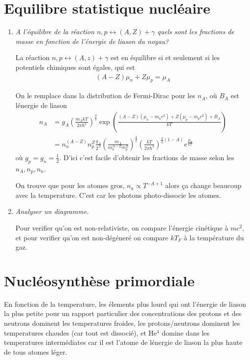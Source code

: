 \documentclass[10pt]{report}
\begin{document}
\section{Equilibre statistique nucl\'eaire}

\begin{enumerate}[1.]
    \item \emph{A l'\'equilibre de la r\'eaction $n,p \leftrightarrow (A,Z) + \gamma$ quels sont les fractions de masse en fonction de l'\'energie de liason du noyau?}

        La r\'eaction $n,p \leftrightarrow (A,z) + \gamma$ est en \'equilibre si et seulement si les potentiels chimiques sont \'egales, qui est
        \begin{align}
            (A-Z)\mu_n + Z\mu_p = \mu_A
        \end{align}

        On le remplace dans la distribution de Fermi-Dirac pour les $n_A$, o\`u $B_A$ est l\'energie de liason
        \begin{align}
            n_A &= g_A\left( \frac{m_A kT}{2\pi \hbar^2} \right)^{\frac{3}{2}}\exp\left( \frac{(A-Z)(\mu_n - m_nc^2) + Z(\mu_p - m_pc^2) + B_A}{kT} \right)\\
            &= n_n^{(A-Z)}n_p^{Z}\frac{g_A}{2^{A}} \left( \frac{m_A}{m_n^{A-Z}m_p^{Z}} \right)^{\frac{3}{2}}\left( \frac{ kT}{2\pi \hbar^2} \right)^{\frac{3}{2}\left( 1 - A \right)}e^{\frac{B_A}{kT}}
        \end{align}
        o\`u $g_p = g_n = \frac{1}{2}$. D'ici c'est facile d'obtenir les fractions de masse selon les $n_A, n_p, n_n$. 

        On trouve que pour les atomes gros, $n_a \propto T^{-A + 1}$ alors \c{c}a change beaucoup avec la temperature. C'est car les photons photo-dissocie les atomes.

    \item \emph{Analyser un diagramme.}

        Pour verifier qu'on est non-relativiste, on compare l'\'energie cin\'etique \`a $mc^2$, et pour verifier qu'on est non-d\'eg\'ener\'e on compare $kT_F$ \`a la temp\'erature du gaz.
\end{enumerate}

\section{Nucl\'eosynth\`ese primordiale}

En fonction de la temperature, les \'elements plus lourd qui ont l'\'energie de liason la plus petite pour un rapport particulier des concentrations des protons et des neutrons dominent les temperatures froides, les protons/neutrons dominent les temperatures chaudes (car tout est dissoci\'e), et He$^4$ domine dans les temperatures interm\'ediates car il est l'atome de l\'energie de liason la plus haute de tous atomes l\'eger.
\end{document}
